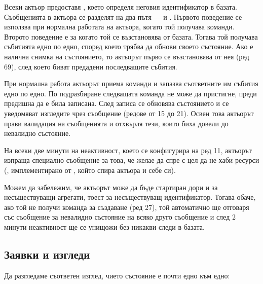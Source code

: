 Всеки актьор предоставя , което определя неговия идентификатор в базата. Съобщенията в актьора се разделят на два пътя —  и . Първото поведение се използва при нормална работата на актьора, когато той получава команди. Второто поведение е за когато той се възстановява от базата. Тогава той получава събитията едно по едно, според което трябва да обнови своето състояние. Ако е налична снимка на състоянието, то актьорът първо се възстановява от нея (ред 69), след което биват предадени последващите събития.

При нормална работа актьорът приема команди и запазва съответните им събития едно по едно. По подразбиране следващата команда не може да пристигне, преди предишна да е била записана. След записа се обновява състоянието и се уведомяват изгледите чрез  съобщение (редове от 15 до 21). Освен това актьорът прави валидация на съобщенията и отхвърля тези, които биха довели до невалидно състояние.

На всеки две минути на неактивност, което се конфигурира на ред 11, актьорът изпраща специално съобщение за това, че желае да спре с цел да не хаби ресурси (, имплементирано от , който спира актьора и себе си).

Можем да забележим, че актьорът може да бъде стартиран дори и за несъществуващи агрегати, тоест за несъществуващ идентификатор. Тогава обаче, ако той не получи команда за създаване (ред 27), той автоматично ще отговаря със съобщение за невалидно състояние на всяко друго съобщение и след 2 минути неактивност ще се унищожи без никакви следи в базата.

\subsection{Заявки и изгледи}

Да разгледаме съответен изглед, чието състояние е почти едно към едно:

